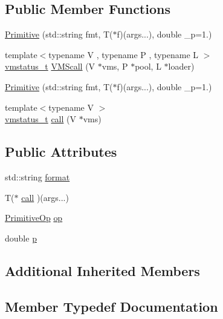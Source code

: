 \subsection*{Public Member Functions}
\begin{DoxyCompactItemize}
\item 
\hyperlink{struct_primitive_a4303c3567a7bb2921d298f48b07b0add}{Primitive} (std\+::string fmt, T($\ast$f)(args...), double \+\_\+p=1.)
\item 
{\footnotesize template$<$typename V , typename P , typename L $>$ }\\\hyperlink{_instruction_8h_a6202215407ab29590bb936ca2996cf64}{vmstatus\+\_\+t} \hyperlink{struct_primitive_a10cedec90ed4a3ff01be2bd3b9c36528}{V\+M\+Scall} (V $\ast$vms, P $\ast$pool, L $\ast$loader)
\item 
\hyperlink{struct_primitive_a4303c3567a7bb2921d298f48b07b0add}{Primitive} (std\+::string fmt, T($\ast$f)(args...), double \+\_\+p=1.)
\item 
{\footnotesize template$<$typename V $>$ }\\\hyperlink{_instruction_8h_a6202215407ab29590bb936ca2996cf64}{vmstatus\+\_\+t} \hyperlink{struct_primitive_aa776657a1c5101422799c33a8d2cfaef}{call} (V $\ast$vms)
\end{DoxyCompactItemize}
\subsection*{Public Attributes}
\begin{DoxyCompactItemize}
\item 
std\+::string \hyperlink{struct_primitive_afa8c2d4087b36ae9580fed3dc00e47b6}{format}
\item 
T($\ast$ \hyperlink{struct_primitive_a31a16d23d239e574ba4e47f6b8e41a9d}{call} )(args...)
\item 
\hyperlink{_instruction_8h_a227278394efd1e2313c727102db09ea9}{Primitive\+Op} \hyperlink{struct_primitive_a45ef953a37468a97b5a4b5531e5f21ce}{op}
\item 
double \hyperlink{struct_primitive_a43fac47ebf8ec63a70443d80dcd04687}{p}
\end{DoxyCompactItemize}
\subsection*{Additional Inherited Members}


\subsection{Member Typedef Documentation}
\mbox{\label{struct_primitive_a1f2d2db3fb7869d03d65112e30d22101}} 
